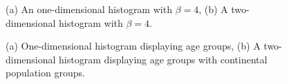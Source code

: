 \begin{figure}[t]
    \centering

    \caption{(a) An one-dimensional histogram with $\beta = 4$,
    (b) A two-dimensional histogram with $\beta = 4$.}
    \label{f:simple-hist}
\end{figure}

\begin{figure}[t]
    \centering

    \caption{(a) One-dimensional histogram displaying age groups,
    (b) A two-dimensional histogram displaying age groups with continental population groups.}
    \label{f:simple-categorical-hist}
\end{figure}

